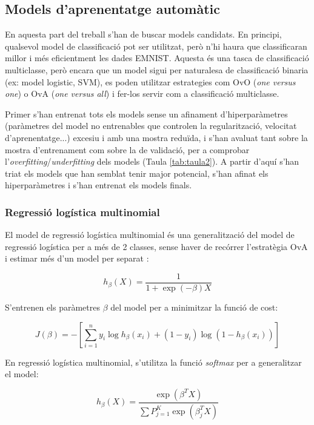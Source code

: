 \documentclass[12pt, spanish]{article}
\begin{document}
\subsection{Models d'aprenentatge automàtic}


En aquesta part del treball s'han de buscar models candidats. En principi, qualsevol model de classificació pot ser utilitzat, però n'hi haura que classificaran millor i més eficientment les dades EMNIST. Aquesta és una tasca de classificació multiclasse, però encara que un model sigui per naturalesa de classificació binaria (ex: model logistic, SVM), es poden utilitzar estrategies com OvO (\textit{one versus one}) o OvA (\textit{one versus all}) i fer-los servir com a classificació multiclasse. 

Primer s'han entrenat tots els models sense un afinament d'hiperparàmetres (paràmetres del model no entrenables que controlen la regularització, velocitat d'aprenentatge...) excesiu i amb una mostra reduïda, i s'han avaluat tant sobre la mostra d'entrenament com sobre la de validació, per a comprobar l'\textit{overfitting}/\textit{underfitting} dels models (Taula \ref{tab:taula2}). A partir d'aquí s'han triat els models que han semblat tenir major potencial, s'han afinat els hiperparàmetres i s'han entrenat els models finals. 

\subsubsection{Regressió logística multinomial}

El model de regressió logística multinomial és una generalització del model de regressió logística per a més de 2 classes, sense haver de recórrer l'estratègia OvA i estimar més d'un model per separat \cite{stanford}:

$$
h_\beta(X) = \frac{1}{1 + \exp(-\beta)X}
$$

S'entrenen els paràmetres $\beta$ del model per a minimitzar la funció de cost:

$$
J(\beta) = -[\sum^n_{i = 1} y_i \log h_\beta (x_i) + (1 - y_i) \log (1 - h_\beta(x_i))]
$$

En regressió logística multinomial, s'utilitza la funció \textit{softmax} per a generalitzar el model:

$$
h_\beta(X) = \frac{\exp(\beta^T X)}{\sum P^K_{j=1} \exp(\beta_j^T X)}
$$
\end{document}
